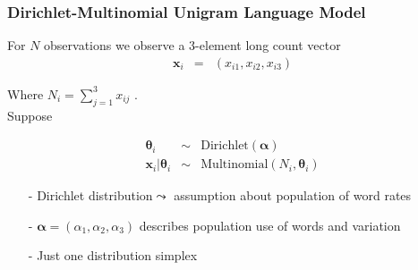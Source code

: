 \documentclass{beamer}
\numberwithin{equation}{section}
\begin{document}
\begin{frame}
\frametitle{Dirichlet-Multinomial Unigram Language Model}

For $N$ observations we observe a $3$-element long count vector 
\begin{eqnarray}
\boldsymbol{x}_{i} & = &  (x_{i1}, x_{i2}, x_{i3}) \nonumber 
\end{eqnarray}


Where $N_{i} = \sum_{j=1}^{3} x_{ij}$ .\\

Suppose 


\begin{eqnarray}
\boldsymbol{\theta}_{i} & \sim & \text{Dirichlet}(\boldsymbol{\alpha}) \nonumber \\
\boldsymbol{x}_{i} | \boldsymbol{\theta}_{i} & \sim & \text{Multinomial}(N_{i}, \boldsymbol{\theta}_{i} ) \nonumber 
\end{eqnarray}

\begin{itemize}
\item[-] Dirichlet distribution$
\leadsto$ assumption about \alert{population} of word rates
\item[-] $\boldsymbol{\alpha}= (\alpha_{1}, \alpha_{2}, \alpha_{3})$ describes population use of words and variation
\item[-] \alert{Just one distribution simplex}
\end{itemize}



\end{frame}



\begin{frame}


\end{frame}
\end{document}
